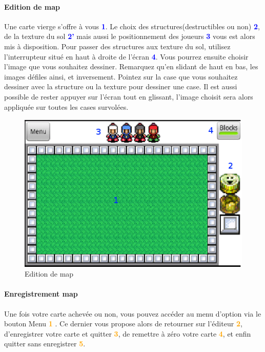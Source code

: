 	
	\paragraph{Edition de map\\}
	Une carte vierge s'offre à vous \textcolor{blue}{\textbf{1}}. Le choix des
	structures(destructibles ou non) \textcolor{blue}{\textbf{2}}, de la texture du
	sol \textcolor{blue}{\textbf{2'}} mais aussi le positionnement des joueurs
	\textcolor{blue}{\textbf{3}} vous est alors mis à disposition. Pour passer des
	structures aux texture du sol, utilisez l'interrupteur situé en haut à droite
	de l'écran \textcolor{blue}{\textbf{4}}. Vous pourrez ensuite choisir l'image
	que vous souhaitez dessiner. Remarquez qu'en slidant de haut en bas, les images défiles ainsi, et inversement. Pointez
	sur la case que vous souhaitez dessiner avec la structure ou la texture pour
	dessiner une case. Il est aussi possible de rester appuyer sur l'écran tout en
	glissant, l'image choisit sera alors appliquée sur toutes les cases survolées.
	
	
	\begin{figure}[H]
	\centering
		\includegraphics[scale=0.7]{Manuel/Img/11}
		\caption{Edition de map}
	\end{figure}
	
	\paragraph{Enregistrement map\\}
	Une fois votre carte achevée ou non, vous pouvez accéder au menu d'option
	via le bouton Menu \textcolor{orange}{\textbf{1}} . Ce dernier vous propose
	alors de retourner sur l'éditeur \textcolor{orange}{\textbf{2}}, d'enregistrer votre
	carte et quitter \textcolor{orange}{\textbf{3}}, de remettre à zéro votre carte
	\textcolor{orange}{\textbf{4}}, et enfin quitter sans enregistrer
	\textcolor{orange}{\textbf{5}}. 
	
